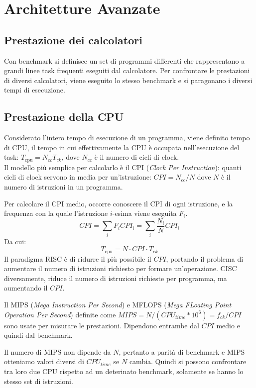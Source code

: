 \documentclass[../template]{subfiles}
\begin{document}
\section{Architetture Avanzate}
\subsection{Prestazione dei calcolatori}
Con benchmark si definisce un set di programmi differenti che rappresentano a grandi linee task frequenti eseguiti dal calcolatore.
Per confrontare le prestazioni di diversi calcolatori, viene eseguito lo stesso benchmark e si paragonano i diversi tempi di esecuzione.

\def\tcpu{T_\text{cpu}}

\subsection{Prestazione della CPU}
Considerato l'intero tempo di esecuzione di un programma, viene definito tempo di CPU, il tempo in cui effettivamente la CPU è occupata nell'esecuzione del task: $\tcpu = N_{cc} T_{ck}$, dove $N_{cc}$ è il numero di cicli di clock.
\\
Il modello più semplice per calcolarlo è il CPI (\textit{Clock Per Instruction}): quanti cicli di clock servono in media
per un'istruzione: $\mathit{CPI} = N_{cc}/N$ dove $N$ è il numero di istruzioni in un programma.

Per calcolare il CPI medio, occorre conoscere il CPI di ogni istruzione, e la frequenza con la quale l'istruzione
$i$-esima viene eseguita $F_i$.
\[
    \mathit{CPI} = \sum_i F_i \mathit{CPI}_i = \sum_i \frac{N_i}{N} \mathit{CPI}_i
\]
Da cui:
\[
    \tcpu = N \cdot \mathit{CPI} \cdot T_{ck}
\]
Il paradigma RISC è di ridurre il più possibile il $\mathit{CPI}$, portando il problema di aumentare il numero di
istruzioni richiesto per formare un'operazione. CISC diversamente, riduce il numero di istruzioni richieste per
programma, ma aumentando il $\mathit{CPI}$.

Il MIPS (\textit{Mega Instruction Per Second}) e MFLOPS (\textit{Mega FLoating Point Operation Per Second}) definite come
$\mathit{MIPS} = N / (\mathit{CPU}_\mathit{time} * 10^6) = f_\mathit{ck} / \mathit{CPI}$ sono usate per misurare le prestazioni.
Dipendono entrambe dal $\mathit{CPI}$ medio e quindi dal benchmark.

Il numero di MIPS non dipende da $N$, pertanto a parità di benchmark e MIPS otteniamo valori diversi di
$\mathit{CPU}_\mathit{time}$ se $N$ cambia. Quindi si possono confrontare tra loro due CPU rispetto ad un deterinato
benchmark, solamente se hanno lo stesso set di istruzioni.
\end{document}

